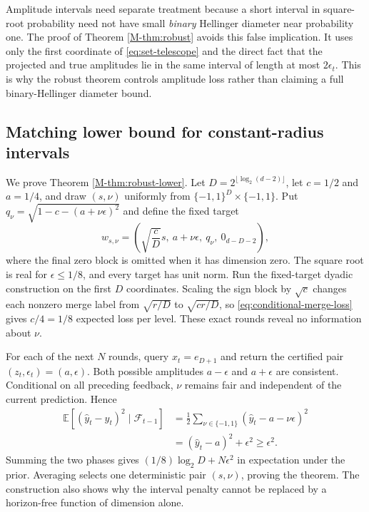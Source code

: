 \documentclass[twoside]{article}
\begin{document}
Amplitude intervals need separate treatment because a short interval in square-root probability need not have small \emph{binary} Hellinger diameter near probability one. The proof of Theorem \ref{M-thm:robust} avoids this false implication. It uses only the first coordinate of \eqref{eq:set-telescope} and the direct fact that the projected and true amplitudes lie in the same interval of length at most $2\epsilon_t$. This is why the robust theorem controls amplitude loss rather than claiming a full binary-Hellinger diameter bound.

\subsection{Matching lower bound for constant-radius intervals}

We prove Theorem \ref{M-thm:robust-lower}. Let $D=2^{\lfloor\log_2(d-2)\rfloor}$, let $c=1/2$ and $a=1/4$, and draw $(s,\nu)$ uniformly from $\{-1,1\}^D\times\{-1,1\}$. Put $q_\nu=\sqrt{1-c-(a+\nu\epsilon)^2}$ and define the fixed target
\begin{equation}
w_{s,\nu}=\left(\sqrt{\frac cD}s,\ a+\nu\epsilon,\ q_\nu,\ 0_{d-D-2}\right),
\label{eq:combined-robust-target}
\end{equation}
where the final zero block is omitted when it has dimension zero. The square root is real for $\epsilon\leq1/8$, and every target has unit norm. Run the fixed-target dyadic construction on the first $D$ coordinates. Scaling the sign block by $\sqrt c$ changes each nonzero merge label from $\sqrt{r/D}$ to $\sqrt{cr/D}$, so \eqref{eq:conditional-merge-loss} gives $c/4=1/8$ expected loss per level. These exact rounds reveal no information about $\nu$.

For each of the next $N$ rounds, query $x_t=e_{D+1}$ and return the certified pair $(z_t,\epsilon_t)=(a,\epsilon)$. Both possible amplitudes $a-\epsilon$ and $a+\epsilon$ are consistent. Conditional on all preceding feedback, $\nu$ remains fair and independent of the current prediction. Hence
\begin{align}
\mathbb E[(\widehat y_t-y_t)^2\mid\mathcal F_{t-1}]
&=\frac12\sum_{\nu\in\{-1,1\}}(\widehat y_t-a-\nu\epsilon)^2\\
&=(\widehat y_t-a)^2+\epsilon^2\geq\epsilon^2.
\end{align}
Summing the two phases gives $(1/8)\log_2D+N\epsilon^2$ in expectation under the prior. Averaging selects one deterministic pair $(s,\nu)$, proving the theorem. The construction also shows why the interval penalty cannot be replaced by a horizon-free function of dimension alone.
\end{document}
